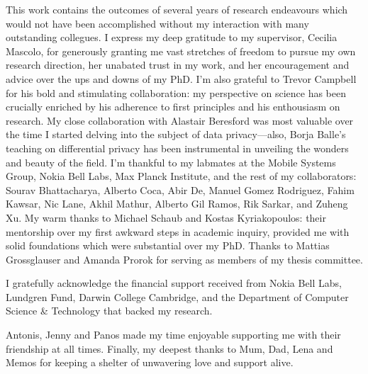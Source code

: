 
\begin{acknowledgements}
This work contains the outcomes of several years of research endeavours which would not have been accomplished without my interaction with many outstanding collegues. I express my deep gratitude to my supervisor, Cecilia Mascolo, for generously granting me vast stretches of freedom to pursue my own research direction, her unabated trust in my work, and her encouragement and advice over the ups and downs of my PhD. I'm also grateful to Trevor Campbell for his bold and stimulating collaboration: my perspective on science has been crucially enriched by his adherence to first principles and his enthousiasm on research. My close collaboration with Alastair Beresford was most valuable over the time I started delving into the subject of data privacy---also, Borja Balle's teaching on differential privacy has been instrumental in unveiling the wonders and beauty of the field. I'm thankful to my labmates at the Mobile Systems Group, Nokia Bell Labs, Max Planck Institute, and the rest of my collaborators:
Sourav Bhattacharya, Alberto Coca, Abir De, Manuel Gomez Rodriguez, Fahim Kawsar, Nic Lane,  Akhil Mathur, Alberto Gil Ramos, Rik Sarkar, and Zuheng Xu. My warm thanks to Michael Schaub and Kostas Kyriakopoulos: their mentorship over my first awkward steps in academic inquiry, provided me with solid foundations which were substantial over my PhD. Thanks to
Mattias Grossglauser and Amanda Prorok for serving as members of my thesis committee.

I gratefully acknowledge the financial support received from Nokia Bell Labs, Lundgren Fund, Darwin College Cambridge, and the Department of Computer Science \& Technology that backed my research. 

Antonis, Jenny and Panos made my time enjoyable supporting me with their friendship at all times. Finally, my deepest thanks to Mum, Dad, Lena and Memos for keeping a shelter of unwavering love and support alive.
\end{acknowledgements}

